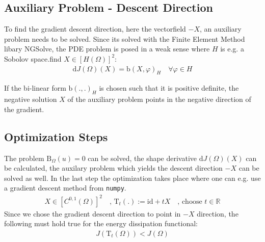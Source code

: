 \subsection*{Auxiliary Problem - Descent Direction}
To find the gradient descent direction, here the vectorfield $-X$, an auxiliary problem needs to be solved.
Since its solved with the Finite Element Method libary NGSolve, the PDE problem is posed in a weak sense where 
$H$ is e.g. a Sobolov space.find $X \in [H(\Omega)]^2:$ 
\begin{align*}
    \mathrm{d}J(\Omega)(X) = \mathrm{b}(X,\varphi)_H \quad \forall  \varphi \in H
\end{align*}

If the bi-linear form $\mathrm{b}(.,.)_H$ is chosen such that it is positive definite, the negative solution $X$
of the auxiliary problem points in the negative direction of the gradient.

\pagebreak

\subsection*{Optimization Steps}
The problem $\mathrm{B}_{\Omega}(u) = 0$ can be solved, the shape derivative $\mathrm{d}J(\Omega)(X)$ can be calculated, the auxilary problem which yields 
the descent direction $-X$ can be solved as well. In the last step the optimization takes place where one can e.g. use a gradient descent method
 from \texttt{numpy}.
 \begin{align*}
    X \in [C^{0,1}(\Omega)]^2 \quad , \, \mathrm{T}_t(.):= \mathrm{id} + tX \quad , \, \text{choose } t \in \mathbb{R}
\end{align*}
Since we chose the gradient descent direction to point in $-X$ direction, the following must hold true for the energy dissipation functional:
\begin{align*}
    J(\mathrm{T}_t(\Omega)) <J(\Omega)
\end{align*}
